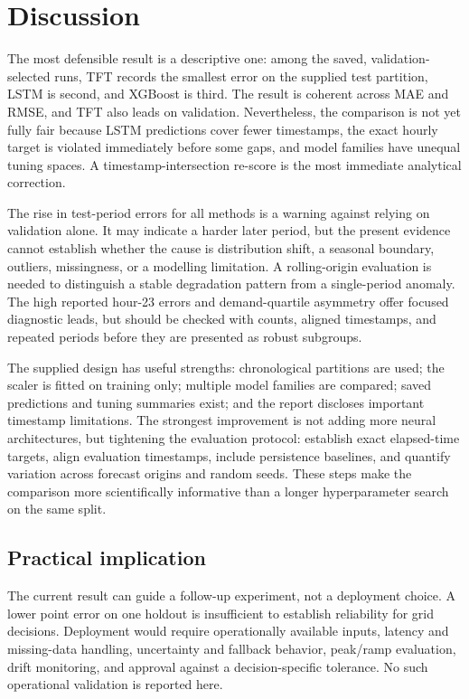 \documentclass[12pt,a4paper]{article}
\begin{document}
\newpage
\section{Discussion}
The most defensible result is a descriptive one: among the saved, validation-selected runs, TFT records the smallest error on the supplied test partition, LSTM is second, and XGBoost is third. The result is coherent across MAE and RMSE, and TFT also leads on validation. Nevertheless, the comparison is not yet fully fair because LSTM predictions cover fewer timestamps, the exact hourly target is violated immediately before some gaps, and model families have unequal tuning spaces. A timestamp-intersection re-score is the most immediate analytical correction.

The rise in test-period errors for all methods is a warning against relying on validation alone. It may indicate a harder later period, but the present evidence cannot establish whether the cause is distribution shift, a seasonal boundary, outliers, missingness, or a modelling limitation. A rolling-origin evaluation is needed to distinguish a stable degradation pattern from a single-period anomaly. The high reported hour-23 errors and demand-quartile asymmetry offer focused diagnostic leads, but should be checked with counts, aligned timestamps, and repeated periods before they are presented as robust subgroups.

The supplied design has useful strengths: chronological partitions are used; the scaler is fitted on training only; multiple model families are compared; saved predictions and tuning summaries exist; and the report discloses important timestamp limitations. The strongest improvement is not adding more neural architectures, but tightening the evaluation protocol: establish exact elapsed-time targets, align evaluation timestamps, include persistence baselines, and quantify variation across forecast origins and random seeds. These steps make the comparison more scientifically informative than a longer hyperparameter search on the same split.

\subsection{Practical implication}
The current result can guide a follow-up experiment, not a deployment choice. A lower point error on one holdout is insufficient to establish reliability for grid decisions. Deployment would require operationally available inputs, latency and missing-data handling, uncertainty and fallback behavior, peak/ramp evaluation, drift monitoring, and approval against a decision-specific tolerance. No such operational validation is reported here.
\end{document}

